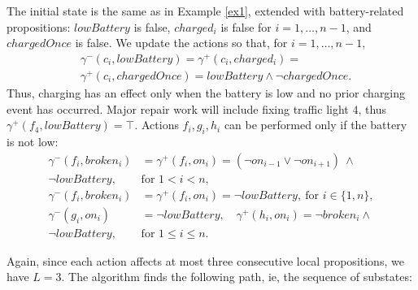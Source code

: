 \documentclass[a4paper,fleqn]{cas-dc}
\begin{document}
The initial state is the same as in Example \ref{ex1}, extended with battery-related propositions: $lowBattery$ is false, $charged_i$ is false for $i=1,\dots,n-1$, and $chargedOnce$ is false.
We update the actions so that, for $i=1,\dots,n-1$,
\begin{equation}
\begin{aligned}
& \gamma^{-}(c_i,lowBattery)=\gamma^{+}(c_i, charged_i)= \\
& \gamma^{+}(c_i, chargedOnce)=lowBattery\wedge \neg chargedOnce.
\end{aligned}
\end{equation}
Thus, charging has an effect only when the battery is low and no prior charging event has occurred. Major repair work will include fixing traffic light $4$, thus $\gamma^{+}(f_4,lowBattery)  = \top$. Actions $f_i, g_i, h_i$ can be performed only if the battery is not low:
\begin{equation}
\begin{aligned}
\gamma^-(f_i, broken_i)&=\gamma^+(f_i, on_i)=(\neg on_{i-1}\lor \neg on_{i+1})\ \wedge \\ 
\neg lowBattery,\ & \text{for } 1<i<n,\\
\gamma^-(f_i, broken_i)&=\gamma^+(f_i, on_i)=\neg lowBattery,\ \text{for } i\in\{1,n\},\\
\gamma^-(g_i, on_i)&=\neg lowBattery,\quad \gamma^+(h_i, on_i)= \neg broken_i \wedge
\\ \neg lowBattery,\ &\text{for } 1\le i\le n.
\end{aligned}
\end{equation}

Again, since each action affects at most three consecutive local propositions, we have $L = 3$. The algorithm finds the following path, ie, the sequence of substates: 
\end{document}

